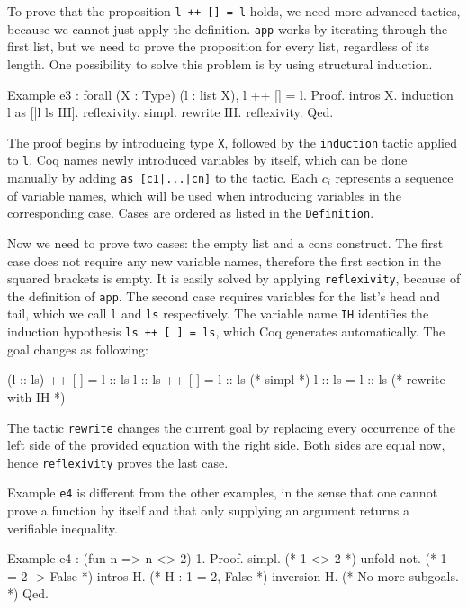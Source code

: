 \documentclass[fleqn]{scrreprt}
\newcommand{\coqinline}[1]{\texttt{#1}}
\begin{document}
\par
To prove that the proposition \coqinline{l ++ [] = l} holds, we need more advanced tactics, because we cannot just apply the definition. \coqinline{app} works by iterating through the first list, but we need to prove the proposition for every list, regardless of its length. One possibility to solve this problem is by using structural induction.
\begin{coqcode}
Example e3 : forall (X : Type) (l : list X), l ++ [] = l.
Proof. intros X. induction l as [|l ls IH].
  reflexivity.
  simpl. rewrite IH. reflexivity.
Qed.
\end{coqcode}
The proof begins by introducing type \coqinline{X}, followed by the \coqinline{induction} tactic applied to \coqinline{l}. Coq names newly introduced variables by itself, which can be done manually by adding \coqinline{as [c1|...|cn]} to the tactic. Each $c_{i}$ represents a sequence of variable names, which will be used when introducing variables in the corresponding case. Cases are ordered as listed in the \coqinline{Definition}.
\par
Now we need to prove two cases: the empty list and a cons construct. The first case does not require any new variable names, therefore the first section in the squared brackets is empty. It is easily solved by applying \coqinline{reflexivity}, because of the definition of \coqinline{app}.
The second case requires variables for the list's head and tail, which we call \coqinline{l} and \coqinline{ls} respectively. The variable name \coqinline{IH} identifies the induction hypothesis \coqinline{ls ++ [ ] = ls}, which Coq generates automatically. The goal changes as following:
\begin{coqcode}
(l :: ls) ++ [ ] = l :: ls
 l :: ls  ++ [ ] = l :: ls (* simpl *)
 l :: ls         = l :: ls (* rewrite with IH *)
\end{coqcode}
The tactic \coqinline{rewrite} changes the current goal by replacing every occurrence of the left side of the provided equation with the right side. Both sides are equal now, hence \coqinline{reflexivity} proves the last case.
\par 
Example \coqinline{e4} is different from the other examples, in the sense that one cannot prove a function by itself and that only supplying an argument returns a verifiable inequality. 
\begin{coqcode}
Example e4 : (fun n => n <> 2) 1.
Proof.
  simpl.       (* 1 <> 2 *)
  unfold not.  (* 1 = 2 -> False *)
  intros H.    (* H : 1 = 2, False *)
  inversion H. (* No more subgoals. *)
Qed.
\end{coqcode}
\end{document}
